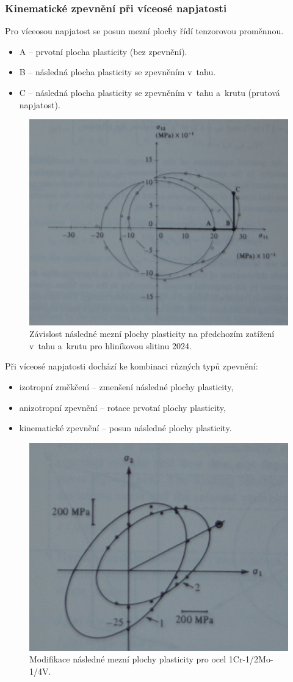 \subsubsection{Kinematické zpevnění při víceosé napjatosti}
Pro víceosou napjatost se posun mezní plochy řídí tenzorovou proměnnou.
\begin{itemize}
	\item A -- prvotní plocha plasticity (bez zpevnění).
	\item B -- následná plocha plasticity se zpevněním v~tahu.
	\item C -- následná plocha plasticity se zpevněním v~tahu a~krutu (prutová napjatost).
\end{itemize}

\begin{figure}[H]
	\centering
	\includegraphics[width=0.7\linewidth]{Obrazky/zavislost-nasledne-mezni-plochy}
	\caption{Závislost následné mezní plochy plasticity na předchozím zatížení v~tahu a~krutu pro hliníkovou slitinu 2024.}
	\label{fig:zavislost-nasledne-mezni-plochy}
\end{figure}

Při víceosé napjatosti dochází ke kombinaci různých typů zpevnění:
\begin{itemize}
	\item izotropní změkčení -- zmenšení následné plochy plasticity,
	\item anizotropní zpevnění -- rotace prvotní plochy plasticity,
	\item kinematické zpevnění -- posun následné plochy plasticity.
\end{itemize}

\begin{figure}[H]
	\centering
	\includegraphics[width=0.7\linewidth]{Obrazky/modifikace-nasledne-mezni-plochy}
	\caption{Modifikace následné mezní plochy plasticity pro ocel 1Cr-1/2Mo-1/4V.}
	\label{fig:modifikace-nasledne-mezni-plochy}
\end{figure}


